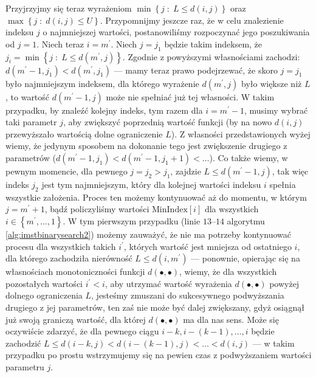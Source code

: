 Przyjrzyjmy się teraz wyrażeniom $\min \left\{ j \; : \; L \leqslant d \left( i, j \right) \right\}$ oraz $\max \left\{ j \; : \; d \left( i, j \right) \leqslant U \right\}$. Przypomnijmy jeszcze raz, że w celu znalezienie indeksu $j$ o najmniejszej wartości, postanowiliśmy rozpoczynać jego poszukiwania od $j = 1$. Niech teraz $i = m^{\prime}$. Niech $j = j_{1}$ będzie takim indeksem, że $j_{i} = \min \left\{ j \; : \; L \leqslant d \left( m^{\prime}, j \right) \right\}$. Zgodnie z powyższymi własnościami zachodzi: $d \left( m^{\prime} - 1, j_{1} \right) < d \left( m^{\prime}, j_{1} \right) $ --- mamy teraz prawo podejrzewać, że skoro $j = j_{1}$ było najmniejszym indeksem, dla którego wyrażenie $d \left( m^{\prime}, j \right)$ było większe niż $L$, to wartość $d \left( m^{\prime} - 1, j \right)$ może nie spełniać już tej własności. W takim przypadku, by znaleźć kolejny indeks, tym razem dla $i = m^{\prime} - 1$, musimy wybrać taki parametr $j$, aby zwiększyć poprzednią wartość funkcji (by na nowo $d \left( i, j \right)$ przewyższało wartością dolne ograniczenie $L$). Z własności przedstawionych wyżej wiemy, że jedynym sposobem na dokonanie tego jest zwiększenie drugiego z parametrów ($d \left( m^{\prime} - 1, j_{1} \right) < d \left( m^{\prime} - 1, j_{1} + 1 \right) < \dots$). Co także wiemy, w pewnym momencie, dla pewnego $j = j_{2} > j_{1}$, zajdzie $L \leqslant d \left( m^{\prime} - 1, j \right)$, tak więc indeks $j_{2}$ jest tym najmniejszym, który dla kolejnej wartości indeksu $i$ spełnia wszystkie założenia. Proces ten możemy kontynuować aż do momentu, w którym $j = m^{\prime} + 1$, bądź policzyliśmy wartości $\text{MinIndex} \left[ i \right]$ dla wszystkich $i \in \left\{ m^{\prime}, \dots, 1 \right\}$. W tym pierwszym przypadku (linie $13$--$14$ algorytmu \ref{alg:imstbinarysearch2}) możemy zauważyć, że nie ma potrzeby kontynuować procesu dla wszystkich takich $i^{\prime}$, których wartość jest mniejsza od ostatniego $i$, dla którego zachodziła nierówność $L \leqslant d \left( i, m^{\prime} \right)$ --- ponownie, opierając się na własnościach monotoniczności funkcji $d \left( \bullet, \bullet \right)$, wiemy, że dla wszystkich pozostałych wartości $i^{\prime} < i$, aby utrzymać wartość wyrażenia $d \left( \bullet, \bullet \right)$ powyżej dolnego ograniczenia $L$, jesteśmy zmuszani do sukcesywnego podwyższania drugiego z jej parametrów, ten zaś nie może być dalej zwiększany, gdyż osiągnął już swoją graniczą wartość, dla której $d \left( \bullet, \bullet \right)$ ma dla nas sens. Może się oczywiście zdarzyć, że dla pewnego ciągu $i - k, i - \left( k - 1 \right), \dots, i$ będzie zachodzić $L \leqslant d \left( i - k, j \right) < d \left( i - \left( k - 1 \right), j \right) < \dots < d \left( i , j \right)$ --- w takim przypadku po prostu wstrzymujemy się na pewien czas z podwyższaniem wartości parametru $j$.

